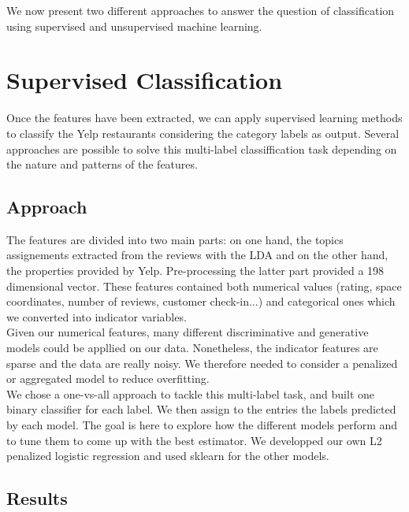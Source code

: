 \documentclass[twoside]{article}
\begin{document}
\begin{multicols}{2}
\noindent We now present two different approaches to answer the question of classification using supervised and unsupervised machine learning.\\

\section{Supervised Classification}

Once the features have been extracted, we can apply supervised learning methods to classify the Yelp restaurants considering the category labels as output. Several approaches are possible to solve this multi-label classiffication task depending on the nature and patterns of the features.

\subsection{Approach}

\noindent The features are divided into two main parts: on one hand, the topics assignements extracted from the reviews with the LDA and on the other hand, the properties provided by Yelp. Pre-processing the latter part provided a 198 dimensional vector. These features contained both numerical values (rating, space coordinates, number of reviews, customer check-in...) and categorical ones which we converted into indicator variables.\\

\noindent Given our numerical features, many different discriminative and generative models could be appllied on our data. Nonetheless, the indicator features are sparse and the data are really noisy. We therefore needed to consider a penalized or aggregated model to reduce overfitting.\\

\noindent We chose a one-vs-all approach to tackle this multi-label task, and built one binary classifier for each label. We then assign to the entries the labels predicted by each model. The goal is here to explore how the different models perform and to tune them to come up with the best estimator. We developped our own L2 penalized logistic regression and used sklearn for the other models.

\subsection{Results}


\end{multicols}
\end{document}
